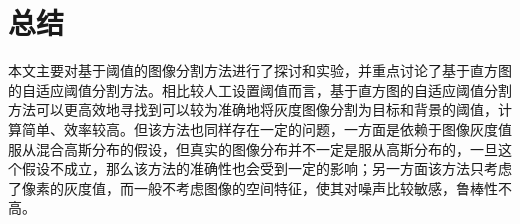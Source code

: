 \section{总结}
本文主要对基于阈值的图像分割方法进行了探讨和实验，并重点讨论了基于直方图的自适应阈值分割方法。相比较人工设置阈值而言，基于直方图的自适应阈值分割方法可以更高效地寻找到可以较为准确地将灰度图像分割为目标和背景的阈值，计算简单、效率较高。但该方法也同样存在一定的问题，一方面是依赖于图像灰度值服从混合高斯分布的假设，但真实的图像分布并不一定是服从高斯分布的，一旦这个假设不成立，那么该方法的准确性也会受到一定的影响；另一方面该方法只考虑了像素的灰度值，而一般不考虑图像的空间特征，使其对噪声比较敏感，鲁棒性不高。
